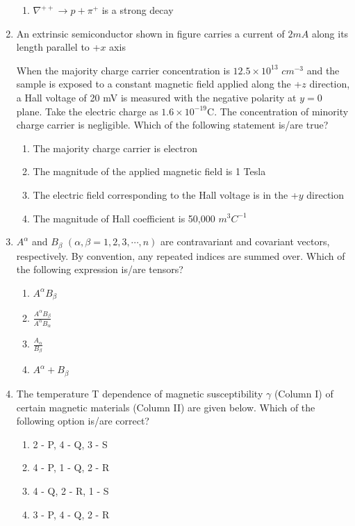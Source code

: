 \documentclass[journal]{IEEEtran}
\begin{document}
\begin{enumerate}
\begin{enumerate}
    \item $\nabla^{++}\rightarrow p+\pi^+$ is a strong decay
\end{enumerate}
\item An extrinsic semiconductor shown in figure carries a current of $2mA$ along its
length parallel to +$x$ axis \\
\begin{figure}[H]
    \centering
    
\end{figure}
When the majority charge carrier concentration is $12.5\times10^{13}$ $cm^{-3}$ and the
sample is exposed to a constant magnetic field applied along the +$z$ direction, a
Hall voltage of 20 mV is measured with the negative polarity at $y=0$ plane.
Take the electric charge as $1.6\times10^{-19}$C. The concentration of minority charge
carrier is negligible. Which of the following statement is/are true?
\begin{enumerate}
    \item The majority charge carrier is electron
    \item The magnitude of the applied magnetic field is 1 Tesla
    \item The electric field corresponding to the Hall voltage is in the +$y$ direction
    \item The magnitude of Hall coefficient is 50,000 $m^3C^{-1}$
\end{enumerate}
\item $A^\alpha$ and $B_\beta$ $(\alpha,\beta=1,2,3,\cdots,n)$ are contravariant and covariant vectors,
respectively. By convention, any repeated indices are summed over. Which of the
following expression is/are tensors?
\begin{enumerate}
    \item $A^\alpha B_\beta$
    \item $\frac{A^\alpha B_\beta}{A^\alpha B_\alpha}$
    \item $\frac{A_\alpha}{B_\beta}$
    \item $A^\alpha+ B_\beta$
\end{enumerate}
\item The temperature T dependence of magnetic susceptibility $\gamma$ (Column I) of certain
magnetic materials (Column II) are given below. Which of the following option
is/are correct? \\
\begin{figure}[H]
    \centering
    
\end{figure}
\begin{enumerate}
    \item 2 - P, 4 - Q, 3 - S
        \item 4 - P, 1 - Q, 2 - R
    \item 4 - Q, 2 - R, 1 - S
    \item 3 - P, 4 - Q, 2 - R

\end{enumerate}
\end{enumerate}
\end{document}
